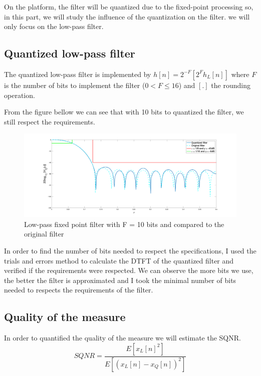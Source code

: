 \documentclass[a4paper]{article}
\begin{document}
On the platform, the filter will be quantized due to the fixed-point processing so, in this part,  we will study the influence of the quantization on the filter. we will only focus on the low-pass filter.

\subsection{Quantized low-pass filter}

The quantized low-pass filter is implemented by $h[n] = 2^{-F} [2^{F}h_L[n]]$ where $F$ is the number of bits to implement the filter ($ 0 < F \leq 16$) and $[.]$ the rounding operation.
\newline

From the figure bellow we can see that with 10 bits to quantized the filter, we still respect the requirements. 

\newpage

\begin{figure}[!ht]
\centering
\includegraphics[scale = 0.12]{fpf}
\caption{Low-pass fixed point filter with F = 10 bits and compared to the original filter}
\label{fig:fpf}
\end{figure}


In order to find the number of bits needed to respect the specifications, I used the trials and errors method to calculate the DTFT of the quantized filter and verified if the requirements were respected. We can observe the more bits we use, the better the filter is approximated and I took the minimal number of bits needed to respects the requirements of the filter.


\subsection{Quality of the measure}
In order to quantified the quality of the measure we will estimate the SQNR.
\begin{equation}
	SQNR = \frac{E[x_L[n]^2]}{E[(x_L[n] - x_Q[n])^2]}
\end{equation}
\end{document}
